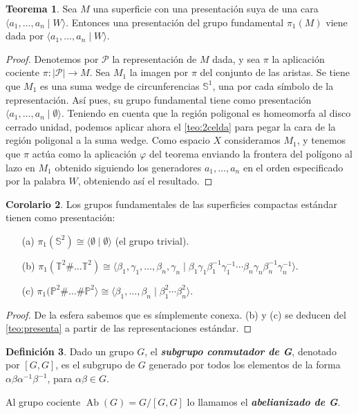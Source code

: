 \documentclass[10pt]{report}
\DeclareMathOperator{\Ab}{Ab}
\newcommand{\Esfera}{\mathbb{S}^2}
\newcommand{\Toro}{\mathbb{T}^2}
\newcommand{\Proyectivo}{\mathbb{P}^2}
\newcommand{\enfatiza}[1]{\textbf{\textit{#1}}}
\theoremstyle{definition}
\newtheorem{defin}{Definición}[section]
\newtheorem{tma}[defin]{Teorema}
\newtheorem{corol}[defin]{Corolario}
\begin{document}
\begin{tma}\label{teo:presenta}
Sea $M$ una superficie con una presentación suya de una cara $\langle a_1, \dots , a_n \mid W\rangle$. Entonces una presentación del grupo fundamental $\pi_1 (M)$ viene dada por $\langle a_1, \dots , a_n \mid W\rangle$.
\end{tma}
\begin{proof}
Denotemos por $\mathcal{P}$ la representación de $M$ dada, y sea $\pi$ la aplicación cociente $\pi: |\mathcal{P}| \to M$. Sea $M_1$ la imagen por $\pi$ del conjunto de las aristas. Se tiene que $M_1$ es una suma wedge de circunferencias $\mathbb{S}^1$, una por cada símbolo de la representación. Así pues, su grupo fundamental tiene como presentación $\langle a_1, \dots ,a_n \mid \emptyset \rangle$. 
Teniendo en cuenta que la región poligonal es homeomorfa al disco cerrado unidad, podemos aplicar ahora el \autoref{teo:2celda} para pegar la cara de la región poligonal a la suma wedge. Como espacio $X$ consideramos $M_1$, y tenemos que $\pi$ actúa como la aplicación $\varphi$ del teorema enviando la frontera del polígono al lazo en $M_1$ obtenido siguiendo los generadores $a_1, \dots , a_n$ en el orden especificado por  la palabra $W$, obteniendo así el resultado.
\end{proof}


\begin{corol}
Los grupos fundamentales de las superficies compactas estándar tienen como presentación:
\begin{itemize}
\item[(a)] $\pi_1 (\Esfera ) \cong \langle \emptyset \mid \emptyset \rangle $ (el grupo trivial).
\item[(b)] $\pi_1 ( \Toro \# \dots \Toro) \cong \langle \beta_1 , \gamma_1 ,\dots ,\beta_n , \gamma_n \mid \beta_1 \gamma_1 \beta^{-1}_1 \gamma^{-1}_1\cdots \beta_n \gamma_n \beta^{-1}_n \gamma^{-1}_n \rangle$.
\item[(c)] $\pi_1(\Proyectivo \# \dots \# \Proyectivo \rangle \cong \langle \beta_1 , \dots , \beta_n \mid \beta_1^{2} \cdots \beta_n^{2} \rangle $. 
\end{itemize}
\end{corol}
\begin{proof}
De la esfera sabemos que es símplemente conexa. (b) y (c) se deducen del \autoref{teo:presenta} a partir de las representaciones estándar.
\end{proof}

\begin{defin}
Dado un grupo $G$, el \enfatiza{subgrupo conmutador de G}, denotado por $\left[ G, G \right]$, es el subgrupo de $G$ generado por todos los elementos de la forma $\alpha \beta \alpha^{-1} \beta^{-1}$, para $\alpha \beta \in G$. 

Al grupo cociente $\Ab{(G)} = G / \left[ G,G \right]$ lo llamamos el \enfatiza{abelianizado de G}. 
\end{defin}
\end{document}
